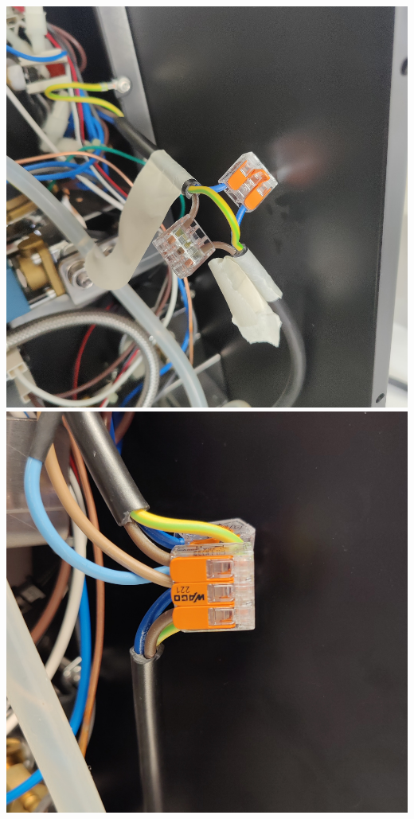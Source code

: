 \documentclass[]{article}
\begin{document}
\begin{minipage}[t]{0.4\linewidth}
	\includegraphics[width=\linewidth]{images/03_installation/13_cut_strip_wago.jpg}
	\includegraphics[width=\linewidth]{images/03_installation/14_connect_psu.jpg}
\end{minipage}
\end{document}
